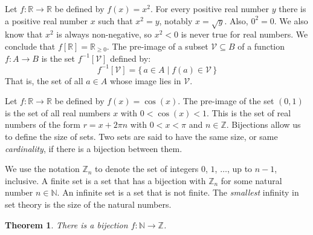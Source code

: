 \documentclass{article}
\theoremstyle{plain}
\newtheorem{theorem}{Theorem}[section]
\theoremstyle{normal}
\newenvironment{example}{%
    \pushQED{\qed}\renewcommand{\qedsymbol}{$\blacksquare$}\examplex%
}{%
    \popQED\endexamplex%
}
\newenvironment{definition}{%
    \pushQED{\qed}\renewcommand{\qedsymbol}{$\blacksquare$}\definitionx%
}{%
    \popQED\enddefinitionx%
}
\newenvironment{notation}{%
    \pushQED{\qed}\renewcommand{\qedsymbol}{$\blacksquare$}\notationx%
}{%
    \popQED\endnotationx%
}
\begin{document}
        \begin{example}
            Let $f:\mathbb{R}\rightarrow\mathbb{R}$ be defined by $f(x)=x^{2}$.
            For every positive real number $y$ there is a positive real number
            $x$ such that $x^{2}=y$, notably $x=\sqrt{y}$. Also, $0^{2}=0$.
            We also know that $x^{2}$ is always non-negative, so $x^{2}<0$
            is never true for real numbers. We conclude that
            $f[\mathbb{R}]=\mathbb{R}_{\geq{0}}$.
        \end{example}
        \begin{definition}[\textbf{Pre-Image of a Set}]
            The pre-image of a subset $\mathcal{V}\subseteq{B}$ of a function
            $f:A\rightarrow{B}$ is the set $f^{-1}[\mathcal{V}]$ defined by:
            \begin{equation}
                f^{-1}[\mathcal{V}]=\{\,a\in{A}\;|\;f(a)\in\mathcal{V}\,\}
            \end{equation}
            That is, the set of all $a\in{A}$ whose image lies in
            $\mathcal{V}$.
        \end{definition}
        \begin{example}
            Let $f:\mathbb{R}\rightarrow\mathbb{R}$ be defined by
            $f(x)=\cos(x)$. The pre-image of the set $(0,1)$ is the set of
            all real numbers $x$ with $0<\cos(x)<1$. This is the set of real
            numbers of the form $r=x+2\pi{n}$ with $0<x<\pi$ and
            $n\in\mathbb{Z}$.
        \end{example}
        Bijections allow us to define the size of sets. Two sets are said to
        have the same size, or same \textit{cardinality}, if there is a
        bijection between them.
        \begin{notation}
            We use the notation $\mathbb{Z}_{n}$ to denote the set of integers
            $0$, $1$, $\dots$, up to $n-1$, inclusive.
        \end{notation}
        A finite set is a set that has a bijection with $\mathbb{Z}_{n}$ for
        some natural number $n\in\mathbb{N}$. An infinite set is a set that is
        not finite. The \textit{smallest} infinity in set theory is the size
        of the natural numbers.
        \begin{theorem}
            There is a bijection $f:\mathbb{N}\rightarrow\mathbb{Z}$.
        \end{theorem}
\end{document}
